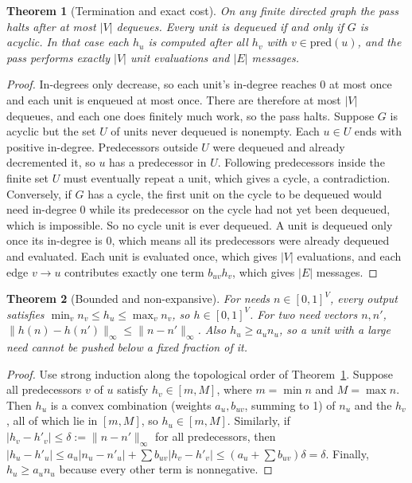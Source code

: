 \documentclass[11pt]{article}
\newtheorem{theorem}{Theorem}
\theoremstyle{definition}
\theoremstyle{remark}
\newcommand{\ninf}[1]{\lVert #1\rVert_\infty}
\begin{document}
\begin{theorem}[Termination and exact cost]\label{thm:term}
On any finite directed graph the pass halts after at most $|V|$ dequeues. Every unit is dequeued if and only if $G$ is acyclic. In that case each $h_u$ is computed after all $h_v$ with $v\in\mathrm{pred}(u)$, and the pass performs exactly $|V|$ unit evaluations and $|E|$ messages.
\end{theorem}
\begin{proof}
In-degrees only decrease, so each unit's in-degree reaches $0$ at most once and each unit is enqueued at most once. There are therefore at most $|V|$ dequeues, and each one does finitely much work, so the pass halts. Suppose $G$ is acyclic but the set $U$ of units never dequeued is nonempty. Each $u\in U$ ends with positive in-degree. Predecessors outside $U$ were dequeued and already decremented it, so $u$ has a predecessor in $U$. Following predecessors inside the finite set $U$ must eventually repeat a unit, which gives a cycle, a contradiction. Conversely, if $G$ has a cycle, the first unit on the cycle to be dequeued would need in-degree $0$ while its predecessor on the cycle had not yet been dequeued, which is impossible. So no cycle unit is ever dequeued. A unit is dequeued only once its in-degree is $0$, which means all its predecessors were already dequeued and evaluated. Each unit is evaluated once, which gives $|V|$ evaluations, and each edge $v\to u$ contributes exactly one term $b_{uv}h_v$, which gives $|E|$ messages.
\end{proof}

\begin{theorem}[Bounded and non-expansive]\label{thm:mentalbound}
For needs $n\in[0,1]^V$, every output satisfies $\min_vn_v\le h_u\le\max_vn_v$, so $h\in[0,1]^V$. For two need vectors $n,n'$, $\ninf{h(n)-h(n')}\le\ninf{n-n'}$. Also $h_u\ge a_un_u$, so a unit with a large need cannot be pushed below a fixed fraction of it.
\end{theorem}
\begin{proof}
Use strong induction along the topological order of Theorem~\ref{thm:term}. Suppose all predecessors $v$ of $u$ satisfy $h_v\in[m,M]$, where $m=\min n$ and $M=\max n$. Then $h_u$ is a convex combination (weights $a_u,b_{uv}$, summing to 1) of $n_u$ and the $h_v$, all of which lie in $[m,M]$, so $h_u\in[m,M]$. Similarly, if $|h_v-h'_v|\le\delta:=\ninf{n-n'}$ for all predecessors, then $|h_u-h'_u|\le a_u|n_u-n'_u|+\sum b_{uv}|h_v-h'_v|\le(a_u+\sum b_{uv})\delta=\delta$. Finally, $h_u\ge a_un_u$ because every other term is nonnegative.
\end{proof}
\end{document}
